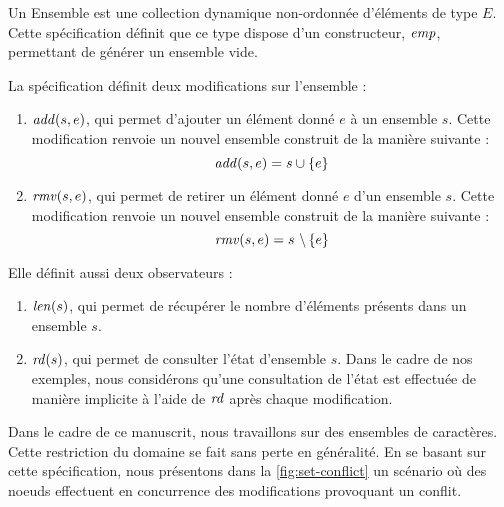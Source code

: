 Un Ensemble est une collection dynamique non-ordonnée d'éléments de type $E$.
Cette spécification définit que ce type dispose d'un constructeur, $\mathit{emp}$, permettant de générer un ensemble vide.

La spécification définit deux modifications sur l'ensemble :
\begin{enumerate}
  \item $\mathit{add}(s,e)$, qui permet d'ajouter un élément donné $e$ à un ensemble $s$.
    Cette modification renvoie un nouvel ensemble construit de la manière suivante :
    \begin{equation*}
      \mathit{add}(s,e) = s \cup \left\{e\right\}
    \end{equation*}
  \item $\mathit{rmv}(s,e)$, qui permet de retirer un élément donné $e$ d'un ensemble $s$.
    Cette modification renvoie un nouvel ensemble construit de la manière suivante :
    \begin{equation*}
      \mathit{rmv}(s,e) = s~\backslash \left\{e\right\}
    \end{equation*}
\end{enumerate}

Elle définit aussi deux observateurs :
\begin{enumerate}
  \item $\mathit{len}(s)$, qui permet de récupérer le nombre d'éléments présents dans un ensemble $s$.
  \item $\mathit{rd}(s)$, qui permet de consulter l'état d'ensemble $s$.
    Dans le cadre de nos exemples, nous considérons qu'une consultation de l'état est effectuée de manière implicite à l'aide de $\mathit{rd}$ après chaque modification.
\end{enumerate}

Dans le cadre de ce manuscrit, nous travaillons sur des ensembles de caractères.
Cette restriction du domaine se fait sans perte en généralité.
En se basant sur cette spécification, nous présentons dans la \autoref{fig:set-conflict} un scénario où des noeuds effectuent en concurrence des modifications provoquant un conflit.

